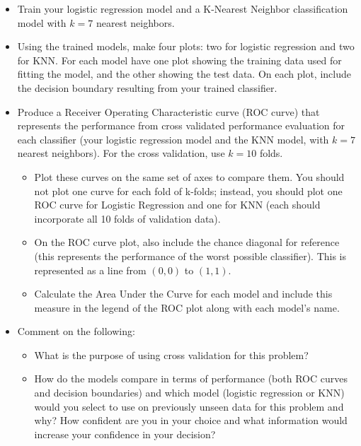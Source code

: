 \documentclass[
  letterpaper,
  DIV=11,
  numbers=noendperiod]{scrartcl}
\providecommand{\tightlist}{%
  \setlength{\itemsep}{0pt}\setlength{\parskip}{0pt}}\usepackage{longtable,booktabs,array}
\begin{document}
\begin{itemize}
\item
  Train your logistic regression model and a K-Nearest Neighbor
  classification model with \(k=7\) nearest neighbors.
\item
  Using the trained models, make four plots: two for logistic regression
  and two for KNN. For each model have one plot showing the training
  data used for fitting the model, and the other showing the test data.
  On each plot, include the decision boundary resulting from your
  trained classifier.
\item
  Produce a Receiver Operating Characteristic curve (ROC curve) that
  represents the performance from cross validated performance evaluation
  for each classifier (your logistic regression model and the KNN model,
  with \(k=7\) nearest neighbors). For the cross validation, use
  \(k=10\) folds.

  \begin{itemize}
  \tightlist
  \item
    Plot these curves on the same set of axes to compare them. You
    should not plot one curve for each fold of k-folds; instead, you
    should plot one ROC curve for Logistic Regression and one for KNN
    (each should incorporate all 10 folds of validation data).
  \item
    On the ROC curve plot, also include the chance diagonal for
    reference (this represents the performance of the worst possible
    classifier). This is represented as a line from \((0,0)\) to
    \((1,1)\).
  \item
    Calculate the Area Under the Curve for each model and include this
    measure in the legend of the ROC plot along with each model's name.
  \end{itemize}
\item
  Comment on the following:

  \begin{itemize}
  \tightlist
  \item
    What is the purpose of using cross validation for this problem?
  \item
    How do the models compare in terms of performance (both ROC curves
    and decision boundaries) and which model (logistic regression or
    KNN) would you select to use on previously unseen data for this
    problem and why? How confident are you in your choice and what
    information would increase your confidence in your decision?
  \end{itemize}
\end{itemize}
\end{document}
